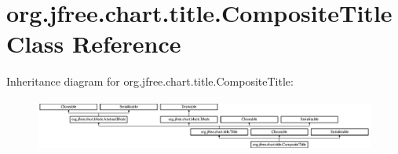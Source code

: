 \hypertarget{classorg_1_1jfree_1_1chart_1_1title_1_1_composite_title}{}\section{org.\+jfree.\+chart.\+title.\+Composite\+Title Class Reference}
\label{classorg_1_1jfree_1_1chart_1_1title_1_1_composite_title}
Inheritance diagram for org.\+jfree.\+chart.\+title.\+Composite\+Title\+:\begin{figure}[H]
\begin{center}
\leavevmode
\includegraphics[height=1.712538cm]{classorg_1_1jfree_1_1chart_1_1title_1_1_composite_title}
\end{center}
\end{figure}
